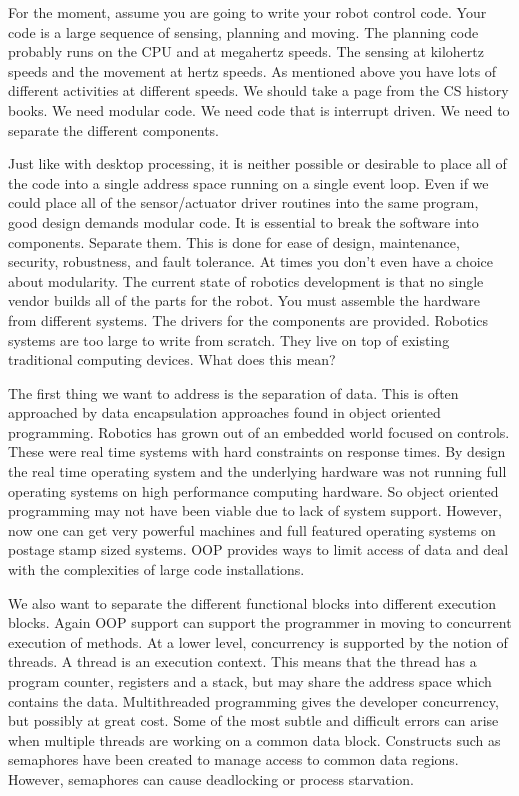 For the moment, assume you are going to write your robot control code.
Your code is a large sequence of sensing, planning and moving. The
planning code probably runs on the CPU and at megahertz speeds. The
sensing at kilohertz speeds and the movement at hertz speeds. As
mentioned above you have lots of different activities at different
speeds. We should take a page from the CS history books. We need modular
code. We need code that is interrupt driven. We need to separate the
different components.

Just like with desktop processing, it is neither possible or desirable
to place all of the code into a single address space running on a single
event loop. Even if we could place all of the sensor/actuator driver
routines into the same program, good design demands modular code. It is
essential to break the software into components. Separate them. This is
done for ease of design, maintenance, security, robustness, and fault
tolerance. At times you don't even have a choice about modularity. The
current state of robotics development is that no single vendor builds
all of the parts for the robot. You must assemble the hardware from
different systems. The drivers for the components are provided. Robotics
systems are too large to write from scratch. They live on top of
existing traditional computing devices. What does this mean?

The first thing we want to address is the separation of data. This is
often approached by data encapsulation approaches found in object
oriented programming. Robotics has grown out of an embedded world
focused on controls. These were real time systems with hard constraints
on response times. By design the real time operating system and the
underlying hardware was not running full operating systems on high
performance computing hardware. So object oriented programming may not
have been viable due to lack of system support. However, now one can get
very powerful machines and full featured operating systems on postage
stamp sized systems. OOP provides ways to limit access of data and deal
with the complexities of large code installations.

We also want to separate the different functional blocks into different
execution blocks. Again OOP support can support the programmer in moving
to concurrent execution of methods. At a lower level, concurrency is
supported by the notion of threads. A thread is an execution context.
This means that the thread has a program counter, registers and a stack,
but may share the address space which contains the data. Multithreaded
programming gives the developer concurrency, but possibly at great cost.
Some of the most subtle and difficult errors can arise when multiple
threads are working on a common data block. Constructs such as
semaphores have been created to manage access to common data regions.
However, semaphores can cause deadlocking or process starvation.

